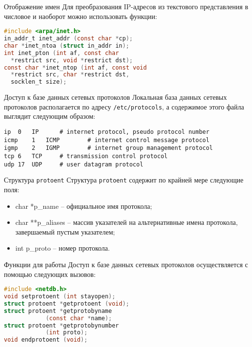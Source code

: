 \begin{frame}[fragile]{Отображение имен}
Для преобразования IP-адресов из текстового представления в числовое и наоборот можно использовать функции:
\scriptsize\begin{lstlisting}[language=C]
#include <arpa/inet.h>
in_addr_t inet_addr (const char *cp);
char *inet_ntoa (struct in_addr in);
int inet_pton (int af, const char 
  *restrict src, void *restrict dst);
const char *inet_ntop (int af, const void 
  *restrict src, char *restrict dst, 
  socklen_t size);
\end{lstlisting}
\end{frame}

\begin{frame}[fragile]{Доступ к базе данных сетевых протоколов}
Локальная база данных сетевых протоколов располагается по адресу {\tt /etc/protocols}, а содержимое этого файла выглядит следующим образом:
\scriptsize\begin{verbatim}
ip	0	IP		# internet protocol, pseudo protocol number
icmp	1	ICMP		# internet control message protocol
igmp	2	IGMP		# internet group management protocol
tcp	6	TCP		# transmission control protocol
udp	17	UDP		# user datagram protocol
\end{verbatim}
\end{frame}

\begin{frame}[fragile]{Структура {\tt protoent}}
Структура {\tt protoent} содержит по крайней мере следующие поля:
\begin{itemize}
	\item char  *p\_name -- официальное имя протокола;
	\item char **p\_aliases -- массив указателей на альтернативные имена протокола, завершаемый пустым указателем;
	\item int    p\_proto -- номер протокола.
\end{itemize}
\end{frame}

\begin{frame}[fragile]{Функции для работы}
Доступ к базе данных сетевых протоколов осуществляется с помощью следующих вызовов:
\scriptsize\begin{lstlisting}[language=C]
#include <netdb.h>
void setprotoent (int stayopen);
struct protoent *getprotoent (void);
struct protoent *getprotobyname 
            (const char *name);
struct protoent *getprotobynumber
			(int proto);
void endprotoent (void);
\end{lstlisting}
\end{frame}

